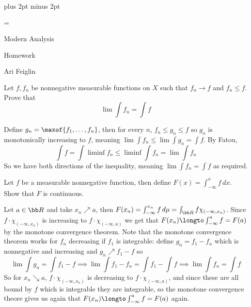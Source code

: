 

\parindent=0pt
\parskip=3pt plus 2pt minus 2pt



\footline={}

\setcounter{section}{5}


\def\printmcount{\the\counter{section}.\the\counter{math counter}}

{

    \centerline{Modern Analysis}
    \smallskip
    \centerline{Homework \the{}}
    \centerline{Ari Feiglin}

\eppbox}

\bexerc

    Let $f,f_n$ be nonnegative measurable functions on $X$ such that $f_n\to f$ and $f_n\leq f$.
    Prove that
    $$ \lim\int f_n = \int f $$

\eexerc

Define $g_n=\maxof{f_1,\dots,f_n}$, then for every $n$, $f_n\leq g_n\leq f$ so $g_n$ is monotonically increasing to $f$, meaning $\lim\int f_n\leq\lim\int g_n=\int f$.
By Fatou,
$$ \int f = \int\liminf f_n \leq \liminf\int f_n = \lim\int f_n $$
So we have both directions of the inequality, meaning $\lim\int f_n=\int f$ as required.

\bexerc

    Let $f$ be a measurable nonnegative function, then define $F(x)=\int_{-\infty}^xf\,dx$.
    Show that $F$ is continuous.

\eexerc

Let $a\in{\bb R}$ and take $x_n\nearrow a$, then $F(x_n)=\int_{-\infty}^{x_n}f\,d\mu=\int_{\bb R}f\chi_{(-\infty,x_n)}$.
Since $f\cdot\chi_{(-\infty,x_n)}$ is increasing to $f\cdot\chi_{(-\infty,a)}$ we get that $F(x_n)\longto\int_{-\infty}^af=F(a)$ by the monotone convergence theorem.
Note that the monotone convergence theorem works for $f_n$ decreasing if $f_1$ is integrable: define $g_n=f_1-f_n$ which is nonnegative and increasing and $g_n\nearrow f_1-f$ so
$$ \lim\int g_n = \int f_1-f \implies \lim\int f_1-f_n = \int f_1-\int f \implies \lim\int f_n = \int f $$
So for $x_n\searrow a$, $f\cdot\chi_{(-\infty,x_n)}$ is decreasing to $f\cdot\chi_{(-\infty,a)}$, and since these are all bound by $f$ which is integrable they are integrable, so the monotone convergence
theore gives us again that $F(x_n)\longto\int_{-\infty}^af=F(a)$ again.

